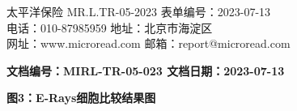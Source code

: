 \documentclass[UTF8,10pt,a4paper,fontset=fandol]{ctexart}
\begin{document}

\vfill

\begin{center}
\footnotesize
太平洋保险 MR.L.TR-05-2023 \quad 表单编号：2023-07-13\\
电话：010-87985959 \quad 地址：北京市海淀区\\
网址：www.microread.com \quad 邮箱：report@microread.com
\end{center}

\newpage

\begin{center}
\textbf{文档编号：MIRL-TR-05-023 \qquad 文档日期：2023-07-13}
\end{center}

\begin{center}
\textbf{图3：E-Rays细胞比较结果图}
\end{center}
\end{document}
